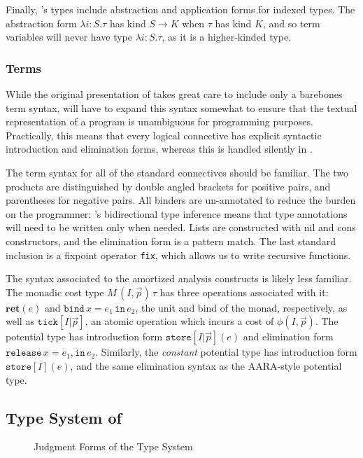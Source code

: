Finally, \dlambdaamor's types include abstraction and application forms for indexed types. The abstraction form $\lambda i :S.\tau$ has kind $S \to K$ when $\tau$ has kind $K$, and so term variables will never have type $\lambda i : S.\tau$, as it is a higher-kinded type.

\subsubsection{Terms}
\label{}
While the original presentation of \lambdaamor takes great care to include only a barebones term syntax, \dlambdaamor will have to expand this syntax somewhat to ensure that the textual representation of a program is unambiguous for programming purposes. Practically, this means that every logical connective has explicit syntactic introduction and elimination forms, whereas this is handled silently in \lambdaamor.

The term syntax for all of the standard connectives should be familiar. The two products are distinguished by double angled brackets for positive pairs, and parentheses for negative pairs. All binders are un-annotated to reduce the burden on the programmer: \bilambdaamor's bidirectional type inference means that type annotations will need to be written only when needed. Lists are constructed with nil and cons constructors, and the elimination form is a pattern match. The last standard inclusion is a fixpoint operator \texttt{fix}, which allows us to write recursive functions. 

The syntax associated to the amortized analysis constructs is likely less familiar. The monadic cost type $M \, (I,\vec{p}) \, \tau$ has three operations associated with it: $\textbf{ret}(e)$ and $\texttt{bind} \, x = e_1 \, \texttt{in}\, e_2$, the unit and bind of the monad, respectively, as well as $\texttt{tick}[I|\vec{p}]$, an atomic operation which incurs a cost of $\phi(I,\vec{p})$. The potential type has introduction form $\texttt{store}[I|\vec{p}](e)$ and elimination form $\texttt{release} \, x = e_1, \texttt{in} \, e_2$. Similarly, the \textit{constant} potential type has introduction form $\texttt{store}[I](e)$, and the same elimination syntax as the AARA-style potential type.

\subsection{Type System of \dlambdaamor}
\begin{figure}
\label{fig:dlambdaamor-typing-judgments}
\caption{Judgment Forms of the \dlambdaamor Type System}
\end{figure}

